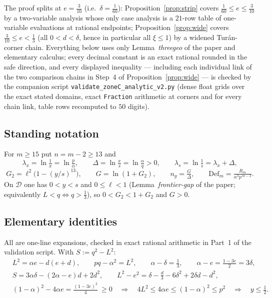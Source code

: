 \documentclass[11pt]{amsart}
\newcommand{\D}{\mathcal D}
\begin{document}
The proof splits at $e=\tfrac3{10}$ (i.e.\ $\delta=\tfrac1{60}$):
Proposition~\ref{prop:strip} covers $\tfrac1{60}\le e\le\tfrac3{10}$ by a
two-variable analysis whose only case analysis is a $21$-row table of
one-variable evaluations at rational endpoints; Proposition~\ref{prop:wide}
covers $\tfrac3{10}\le e<\tfrac13$ (all $0<d<\delta$, hence in particular
all $\xi\le1$) by a widened Tur\'an-corner chain.  Everything below uses only
Lemma~\emph{threegeo} of the paper and elementary calculus; every decimal
constant is an exact rational rounded in the safe direction, and every
displayed inequality --- including each individual link of the two
comparison chains in Step~4 of Proposition~\ref{prop:wide} --- is checked
by the companion script \texttt{validate\_zoneC\_analytic\_v2.py} (dense
float grids over the exact stated domains, exact \texttt{Fraction}
arithmetic at corners and for every chain link, table rows recomputed to
$50$ digits).

\subsection*{Standing notation}
For $m\ge15$ put $n=m-2\ge13$ and
\[
 \lambda_x=\ln\tfrac1x=\ln\tfrac p\alpha,\qquad
 \Delta=\ln\tfrac xs=\ln\tfrac\alpha q>0,\qquad
 \lambda_s=\ln\tfrac1s=\lambda_x+\Delta,
\]
\[
 G_2=\ell^2\bigl(1-(y/s)^{13}\bigr),\qquad G=\ln(1+G_2),\qquad
 n_g=\tfrac G\Delta,\qquad
 \mathrm{Def}_m=\tfrac{R_m}{\alpha^3p^{\,m-2}} .
\]
On $\D$ one has $0<y<s$ and $0\le\ell<1$ (Lemma~\emph{frontier-gap} of the
paper; equivalently $L<q\iff q>\tfrac13$), so $0<G_2<1+G_2$ and $G>0$.

\subsection*{Elementary identities}
All are one-line expansions, checked in exact rational arithmetic in Part~1
of the validation script.  With $S:=q^2-L^2$:
\begin{align}
 &L^2=\alpha e-d(e+d),\qquad pq-\alpha^2=L^2,\qquad
 \alpha-\delta=\tfrac13,\qquad \alpha-e=\tfrac{1-3e}2=3\delta,
 \label{eq:id1}\\
 &S=3\alpha\delta-(2\alpha-e)d+2d^2,\qquad
 L^2-e^2=\delta-\tfrac d3-6\delta^2+2\delta d-d^2,\label{eq:id2}\\
 &(1-\alpha)^2-4\alpha e=\tfrac{(1-3e)^2}4\ \ge0
 \quad\Longrightarrow\quad 4L^2\le4\alpha e\le(1-\alpha)^2\le p^2
 \quad\Longrightarrow\quad y\le\tfrac12.\label{eq:yhalf}
\end{align}
\end{document}
